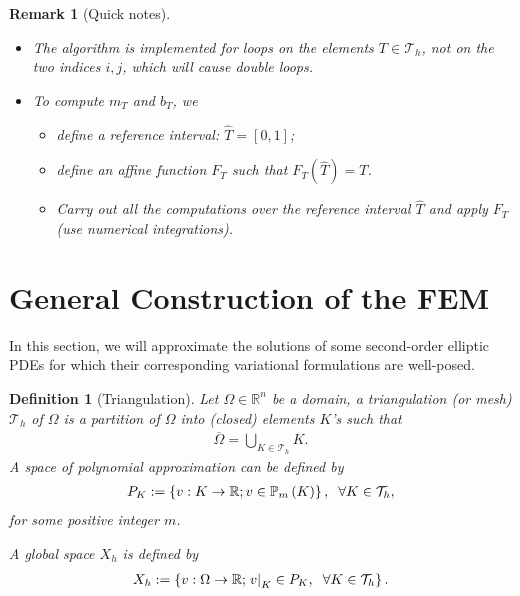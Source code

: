 \documentclass[11pt,a4paper,center,notitlepage]{article}
\numberwithin{equation}{section}
\newtheorem{definition}{Definition}[section]
\newtheorem{remark}{Remark}[section]
\begin{document}
\begin{remark}[Quick notes]
\begin{itemize}
\item The algorithm is implemented for loops on the elements $T\in \mathcal{T}_h$, not on the two indices $i, j$, which will cause double loops.
\item To compute $m_T$ and $b_T$, we
\begin{itemize}
\item[$\circ$] define a reference interval: $\widehat{T} =\left[0,1\right]$;
\item[$\circ$] define an affine function $F_T$ such that $F_T\left(\widehat{T}\right)=T$.
\item[$\circ$] Carry out all the computations over the reference interval $\widehat{T}$ and apply $F_T$ (use numerical integrations).
\end{itemize}
\end{itemize}
\end{remark}

\section{General Construction of the FEM}
In this section, we will approximate the solutions of some second-order elliptic PDEs for which their corresponding variational formulations are well-posed.
\begin{definition}[Triangulation]
Let $\Omega \in \mathbb{R}^n$ be a domain, a \emph{triangulation} (or \emph{mesh}) $\mathcal{T}_h$ of $\Omega$ is a partition of $\Omega$ into (closed) elements $K$'s such that 
\begin{align}
\overline \Omega   = \bigcup\limits_{K \in {\mathcal{T}_h}} K .
\end{align}
A \emph{space of polynomial approximation} can be defined by
\begin{align}
\label{1.73}
{P_K}: = \left\{ {v:K \to \mathbb{R};v \in {\mathbb{P}_m}\left( K \right)} \right\}, \hspace{2mm} \forall K \in {\mathcal{T}_h} ,
\end{align}
for some positive integer $m$.

A \emph{global space} $X_h$ is defined by
\begin{align}
{X_h}: = \left\{ {v:\Omega  \to \mathbb{R};{{\left. v \right|}_K} \in {P_K},\hspace{2mm} \forall K \in {\mathcal{T}_h}} \right\} .
\end{align}
\end{definition}
\end{document}
